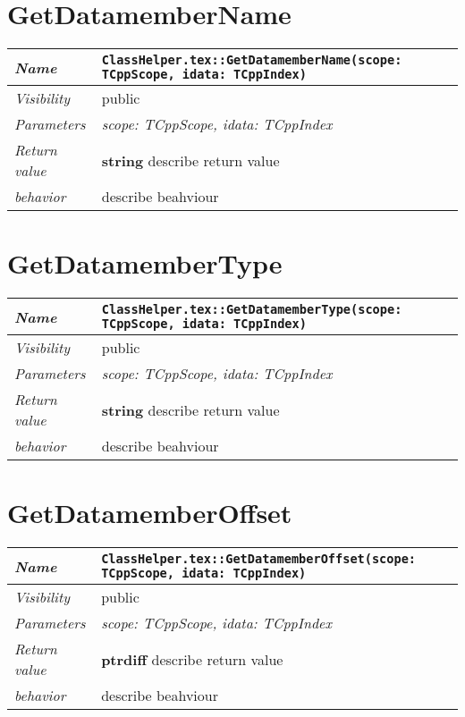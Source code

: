  \section{GetDatamemberName}
\begin{longtable}{p{3cm} @{\hskip 1cm} p{12cm}}
 \hline
\textit{Name} & \texttt{ClassHelper.tex::GetDatamemberName(scope: TCppScope, idata: TCppIndex)}\\
\hline
 \textit{Visibility} & public\\
\hline
\textit{Parameters} & \textit{scope: TCppScope, idata: TCppIndex}\\
\hline
\textit{Return value} & \textbf{ string} describe return value\\
  \hline
 \textit{behavior} & describe beahviour \\
\hline
\end{longtable} \pagebreak
 \section{GetDatamemberType}
\begin{longtable}{p{3cm} @{\hskip 1cm} p{12cm}}
 \hline
\textit{Name} & \texttt{ClassHelper.tex::GetDatamemberType(scope: TCppScope, idata: TCppIndex)}\\
\hline
 \textit{Visibility} & public\\
\hline
\textit{Parameters} & \textit{scope: TCppScope, idata: TCppIndex}\\
\hline
\textit{Return value} & \textbf{ string} describe return value\\
  \hline
 \textit{behavior} & describe beahviour \\
\hline
\end{longtable} \pagebreak
 \section{GetDatamemberOffset}
\begin{longtable}{p{3cm} @{\hskip 1cm} p{12cm}}
 \hline
\textit{Name} & \texttt{ClassHelper.tex::GetDatamemberOffset(scope: TCppScope, idata: TCppIndex)}\\
\hline
 \textit{Visibility} & public\\
\hline
\textit{Parameters} & \textit{scope: TCppScope, idata: TCppIndex}\\
\hline
\textit{Return value} & \textbf{ ptrdiff} describe return value\\
  \hline
 \textit{behavior} & describe beahviour \\
\hline
\end{longtable} \pagebreak
